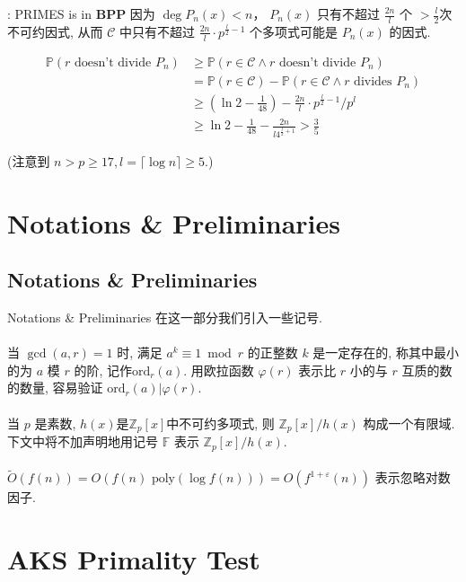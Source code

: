 \documentclass{beamer}
\def\P#1{\mathbb{P}\left({#1}\right)}
\def\ge{\geqslant}
\def\ord{\textrm{ord}}
\begin{document}
\begin{frame}{\cite{AB99}: \textsf{PRIMES} is in \textbf{BPP}}
	因为 $\deg P_n(x) < n$， $P_n(x)$ 只有不超过 $\frac{2n}{l}$ 个 $>\frac{l}{2}$次不可约因式, 从而 $\mathcal C$ 中只有不超过 $\frac{2n}{l} \cdot p^{\frac l2 - 1}$ 个多项式可能是 $P_n(x)$ 的因式.

	\begin{align*}
		\P{r \textrm{ doesn't divide } P_n} &\ge \P{r \in \mathcal C \wedge r \textrm{ doesn't divide } P_n}\\
		&= \P{r \in \mathcal C} - \P{r \in \mathcal C \wedge r \textrm{ divides } P_n}\\
		&\ge \left(\ln 2 - \frac{1}{48}\right) - \frac{2n}{l} \cdot p^{\frac l2 - 1} / p^l\\
		& \ge \ln 2 - \frac{1}{48} - \frac{2n}{l4^{\frac l2 + 1}} > \frac 35
	\end{align*}

	(注意到 $n > p \ge 17, l = \lceil \log n \rceil \ge 5$.)
\end{frame}

\section{Notations \& Preliminaries}
\subsection{Notations \& Preliminaries}
\begin{frame}{Notations \& Preliminaries}
	在这一部分我们引入一些记号.\\~\\

	当 $\gcd(a, r) = 1$ 时, 满足 $a^k \equiv 1 \bmod r$ 的正整数 $k$ 是一定存在的, 称其中最小的为 $a$ 模 $r$ 的阶, 记作$\ord_{r}(a)$. 用欧拉函数 $\varphi(r)$ 表示比 $r$ 小的与 $r$ 互质的数的数量, 容易验证 $\ord_r(a) | \varphi(r)$.\\~\\

	当 $p$ 是素数, $h(x)$是$\mathbb Z_p[x]$中不可约多项式, 则 $\mathbb Z_p[x] / h(x)$ 构成一个有限域. 下文中将不加声明地用记号 $\mathbb F$ 表示 $\mathbb Z_p[x] / h(x)$.\\~\\

	$\tilde O(f(n)) = O(f(n) \textrm{ poly}(\log f(n))) = O(f^{1 + \varepsilon}(n)) $ 表示忽略对数因子.

\end{frame}
\section{AKS Primality Test}
\end{document}
